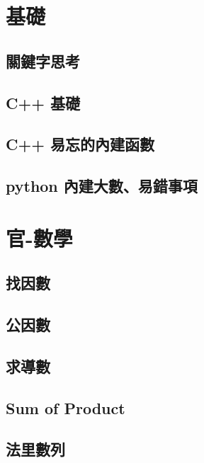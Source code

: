 \section{基礎}
\subsection{關鍵字思考}
\raggedbottom
\hrulefill
\subsection{C++ 基礎}
\raggedbottom
\hrulefill
\subsection{C++ 易忘的內建函數}
\raggedbottom
\hrulefill
\subsection{python 內建大數、易錯事項}
\raggedbottom
\hrulefill

\section{官-數學}
\subsection{找因數}
\raggedbottom
\hrulefill
\subsection{公因數}
\raggedbottom
\hrulefill
\subsection{求導數}
\raggedbottom
\hrulefill
\subsection{Sum of Product}
\raggedbottom
\hrulefill
\subsection{法里數列}
\raggedbottom
\hrulefill


